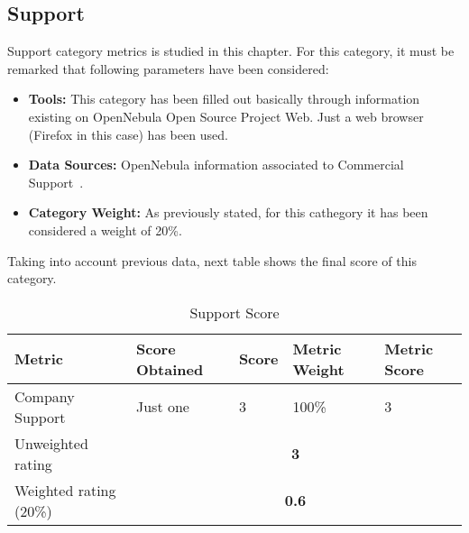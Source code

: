 \documentclass[11pt]{article}
\begin{document}
\subsection{Support}
Support category metrics is studied in this chapter. For this category, it must be remarked that following parameters have been considered:
\begin{itemize}\itemsep0pt
\item{\textbf{Tools:}} This category has been filled out basically through information existing on OpenNebula Open Source Project Web. Just a web browser (Firefox in this case) has been used.
\item{\textbf{Data Sources:}} OpenNebula information associated to Commercial Support~\cite{OPNEB01}.
\item{\textbf{Category Weight:}} As previously stated, for this cathegory it has been considered a weight of 20\%.
\end{itemize}
Taking into account previous data, next table shows the final score of this category.
\begin{table}[H]
  \begin{center}
    \begin{tabular}{ | p{4cm} | p{3cm} | l | p{1.2cm} | p{1.2cm} | }
    \hline
    \textbf{Metric} & \textbf{Score Obtained} & \textbf{Score} & \textbf{Metric Weight} & \textbf{Metric Score}\\
    \hline
    Company Support & Just one & 3 & 100\% & 3\\
    \hline
    Unweighted rating & \multicolumn{4}{c|}{\textbf{3}}\\
    \hline
    Weighted rating (20\%) & \multicolumn {4}{c|}{\textbf{0.6}}\\
    \hline
    \end{tabular}
    \caption{Support Score}
    \label{tab:supp_score}
  \end{center}
\end{table}
\end{document}
